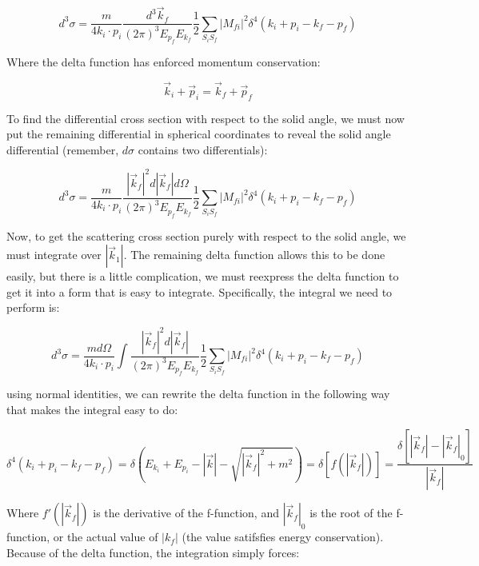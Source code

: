 \documentclass[a4]{article}
\begin{document}
    \begin{equation}
        d^3 \sigma = \frac{m}{4 k_i \cdot p_i} \frac{d^3 \vec{k}_f}{(2 \pi)^3 E_{p_f} E_{k_f}} \frac{1}{2} \sum_{S_i S_f} |M_{fi}|^2 \delta^4 (k_i + p_i - k_f - p_f)
    \end{equation}

    Where the delta function has enforced momentum conservation:

    \begin{equation}
        \vec{k}_{i} + \vec{p}_{i} = \vec{k}_{f} + \vec{p}_{f}
    \end{equation}

    To find the differential cross section with respect to the solid angle, we must now put the remaining differential in spherical coordinates to
    reveal the solid angle differential (remember, $d\sigma$ contains two differentials):

    \begin{equation}
        d^3 \sigma = \frac{m}{4 k_i \cdot p_i} \frac{|\vec{k}_f|^2 d|\vec{k}_f| d \Omega}{(2 \pi)^3 E_{p_f} E_{k_f}} \frac{1}{2} \sum_{S_i S_f} |M_{fi}|^2 \delta^4 (k_i + p_i - k_f - p_f)
    \end{equation}

    Now, to get the scattering cross section purely with respect to the solid angle, we must integrate over $|\vec{k}_1|$. The remaining delta function
    allows this to be done easily, but there is a little complication, we must reexpress the delta function to get it into a form that is easy to integrate.
    Specifically, the integral we need to perform is:

    \begin{equation}
        d^3 \sigma = \frac{m d\Omega}{4 k_i \cdot p_i} \int \frac{|\vec{k}_f|^2 d|\vec{k}_f|}{(2 \pi)^3 E_{p_f} E_{k_f}} \frac{1}{2} \sum_{S_i S_f} |M_{fi}|^2 \delta^4 (k_i + p_i - k_f - p_f)
    \end{equation}

    using normal identities, we can rewrite the delta function in the following way that makes the integral easy to do:

    \begin{equation}
        \delta^4 (k_i + p_i - k_f - p_f) = \delta (E_{k_i} + E_{p_i} - |\vec{k}| - \sqrt{|\vec{k}_f|^2 + m^2}) = \delta[f(|\vec{k}_f|)] = \frac{\delta[|\vec{k}_f| - |\vec{k}_f|_0]}{|\vec{k}_f|}
    \end{equation}

    Where $f'(|\vec{k}_f|)$ is the derivative of the f-function, and $|\vec{k}_f|_0$ is the root of the f-function, or the actual value of $|k_f|$ (the value
    satifsfies energy conservation). Because of the delta function, the integration simply forces:
\end{document}
